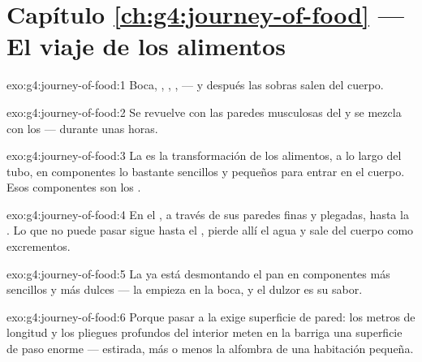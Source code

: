 \section*{Capítulo \ref{ch:g4:journey-of-food} --- El viaje de los alimentos}

\begin{solution}{exo:g4:journey-of-food:1}
Boca, , , ,  --- y
después las sobras salen del cuerpo.
\end{solution}

\begin{solution}{exo:g4:journey-of-food:2}
Se revuelve con las paredes musculosas del  y se mezcla con
los  --- durante unas horas.
\end{solution}

\begin{solution}{exo:g4:journey-of-food:3}
La  es la transformación de los alimentos, a lo largo del
tubo, en componentes lo bastante sencillos y pequeños para entrar en
el cuerpo. Esos componentes son los .
\end{solution}

\begin{solution}{exo:g4:journey-of-food:4}
En el , a través de sus paredes finas y plegadas,
hasta la . Lo que no puede pasar sigue hasta el , pierde allí el agua y sale del cuerpo como excrementos.
\end{solution}

\begin{solution}{exo:g4:journey-of-food:5}
La  ya está desmontando el pan en componentes más sencillos y
más dulces --- la  empieza en la boca, y el dulzor es su
sabor.
\end{solution}

\begin{solution}{exo:g4:journey-of-food:6}
Porque pasar a la  exige superficie de pared: los metros de
longitud y los pliegues profundos del interior meten en la barriga una
superficie de paso enorme --- estirada, más o menos la alfombra de una
habitación pequeña.
\end{solution}

